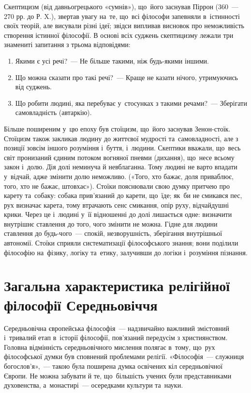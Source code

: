 \documentclass[a5paper,oneside,DIV=12,12pt,headings=small]{scrartcl}
\begin{document}
		Скептицизм (від давньогрецького «сумнів»), що~його заснував Піррон (360~— 270 рр. до Р. X.), звертав увагу на~те, що~всі філософи запевняли в~істинності своїх теорій, але висували різні ідеї; звідси випливав висновок про неможливість створення істинної філософії. В основі всіх суджень скептицизму лежали три знамениті запитання з трьома відповідями:
		\begin{enumerate}
			\item Якими є усі речі?~— Не більше такими, ніж будь-якими іншими.
			\item Що можна сказати про такі речі?~— Краще не казати нічого, утримуючись від суджень.
			\item Що робити людині, яка перебуває у~стосунках з такими речами?~— Зберігати самовладність (автаркію).
		\end{enumerate}
		
		Більше поширеним у~цю епоху був стоїцизм, що~його заснував Зенон-стоїк. Стоїцизм також закликав людину до життєвої мудрості та~самовладності, але з позиції зовсім іншого розуміння і~буття, і~людини. Скептики вважали, що~весь світ пронизаний єдиним потоком вогняної пневми (дихання), що~несе всьому закон і~долю. Дія долі неминуча й невблаганна. Тому людині не варто впадати у~відчай, адже змінити долю неможливо. («Того, хто бажає, доля приваблює, того, хто не бажає, штовхає»). Стоїки пояснювали свою думку притчею про карету та~собаку: собака прив'язаний до карети, що~їде; як~би не смикався пес, рух визначає карета, тому втрачають сенс смикання, опір руху, відчайдушні крики. Через це і~людині у~її відношенні до долі лишається одне: визначити внутрішнє ставлення до того, чого змінити не можна. Гідне для людини ставлення до будь-чого~— спокій, незворушність, зберігання внутрішньої автономії. Стоїки сприяли систематизації філософського знання; вони поділили філософію на~фізику, логіку та~етику, залучивши до логіки і~розуміння пізнання.
		
	\section{Загальна характеристика релігійної філософії Середньовіччя}
		Середньовічна європейська філософія~— надзвичайно важливий змістовний і~тривалий етап в~історії філософії, пов'язаний передусім з християнством. Головна відмінність середньовічного мислення полягає в~тому, що~рух філософської думки був сповнений проблемами релігії. «Філософія~— служниця богослов'я»,~— такою була поширена думка освічених кіл середньовічної Європи. Не можна забувати й те, що~більшість учених були представниками духовенства, а~монастирі~— осередками культури та~науки.
\end{document}
